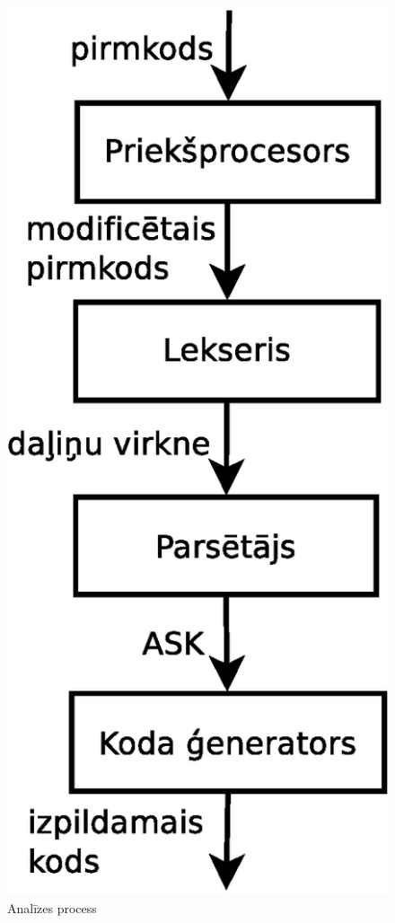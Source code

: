 \begin{figure}[H]
  \centering
    \includegraphics[scale=0.4]{pictures/usual_compiling}
  \caption{\label{fig:usual_compiling}Analīzes process}
\end{figure}

